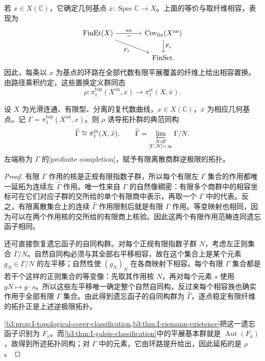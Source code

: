 若 \(x\in X(\mathbb C)\)，它确定几何基点 \(\bar x:\operatorname{Spec}\mathbb C\rightarrow X\)。上面的等价与取纤维相容，表现为
\[
	\begin{tikzcd}[column sep=large]
		\operatorname{FinEt}(X)
		\arrow[r,"\operatorname{an}","\sim"']
		\arrow[dr,"F_{\bar x}"']
		&
		\mathrm{Cov}_{\mathrm{fin}}(X^{\mathrm{an}})
		\arrow[d,"F_x"]\\
		&\mathrm{FinSet}.
	\end{tikzcd}
\]
因此，每条以 \(x\) 为基点的环路在全部代数有限平展覆盖的纤维上给出相容置换。由路径乘积约定，这些置换定义群同态
\[
	\rho:\pi_1^{\mathrm{top}}(X^{\mathrm{an}},x)
	\longrightarrow\pi_1^{\mathrm{\acute et}}(X,\bar x).
\]

\begin{corollary}\label{b3:cor:I-comparison-fundamental-groups}
	设 \(X\) 为光滑连通、有限型、分离的复代数曲线，\(x\in X(\mathbb C)\)，\(\bar x\) 为相应几何基点。记 \(\Gamma=\pi_1^{\mathrm{top}}(X^{\mathrm{an}},x)\)。则 \(\rho\) 诱导拓扑群的典范同构
	\[
		\widehat\Gamma
		\cong\pi_1^{\mathrm{\acute et}}(X,\bar x),
		\qquad
		\widehat\Gamma
		=\varprojlim_{\substack{N\triangleleft\Gamma\\{}[\Gamma:N]<\infty}}\Gamma/N.
	\]
	左端称为 \(\Gamma\) 的[profinite completion]，赋予有限离散商群逆极限的拓扑。
\end{corollary}
\begin{proof}
	有限 \(\Gamma\) 作用的核是正规有限指数子群，所以每个有限左 \(\Gamma\) 集合的作用都唯一延拓为连续左 \(\widehat\Gamma\) 作用。唯一性来自 \(\Gamma\) 的自然像稠密：有限多个商群中的相容坐标可在它们对应子群的交所给的单个有限商中表示，再取一个 \(\Gamma\) 中的代表。反之，有限离散集合上的连续 \(\widehat\Gamma\) 作用限制后就是有限 \(\Gamma\) 作用。等变映射也相同，因为可以在两个作用核的交所给的有限商上核验。因此这两个有限作用范畴连同遗忘函子相同。

	还可直接恢复遗忘函子的自同构群。对每个正规有限指数子群 \(N\)，考虑左正则集合 \(\Gamma/N\)。自然自同构必须与其全部右平移相容，故在这个集合上是某个元素 \(g_N\in\Gamma/N\) 的左平移；自然性使 \((g_N)_N\) 在各商映射下相容。每个有限 \(\Gamma\) 集合都是若干个这样的正则集合的等变像：先取其作用核 \(N\)，再对每个元素 \(s\) 使用 \(gN\mapsto g\cdot s\)。所以这些左平移唯一确定整个自然自同构，反过来每个相容族也确实作用于全部有限 \(\Gamma\) 集合。由此得到遗忘函子的自同构群为 \(\widehat\Gamma\)，逐点稳定有限纤维的拓扑正是上述逆极限拓扑。

	\cref{b3:prop:I-topological-cover-classification,b3:thm:I-riemann-existence}把这一遗忘函子识别为 \(F_{\bar x}\)。而\cref{b3:thm:I-galois-classification}中的平展基本群就是 \(\operatorname{Aut}(F_{\bar x})\)，故得到所述拓扑同构；对 \(\Gamma\) 中的元素，它由环路提升给出，因此延拓的是 \(\rho\)。
\end{proof}


